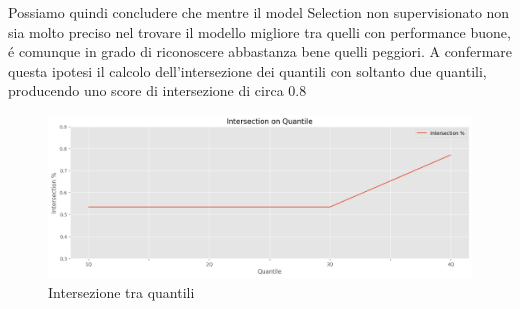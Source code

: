 Possiamo quindi concludere che mentre il model Selection non supervisionato non sia molto preciso nel trovare il modello migliore tra quelli con performance buone, é comunque in grado di riconoscere abbastanza bene quelli peggiori. A confermare questa ipotesi il calcolo dell'intersezione dei quantili con soltanto due quantili, producendo uno score di intersezione di circa \(0.8\)

\begin{figure}[t]
	\centering
	\includegraphics[width=14cm, scale=1]{images/4quantile}
	\caption{Intersezione tra quantili}
	\label{quantile-intersection}
		
\end{figure}


\newpage
